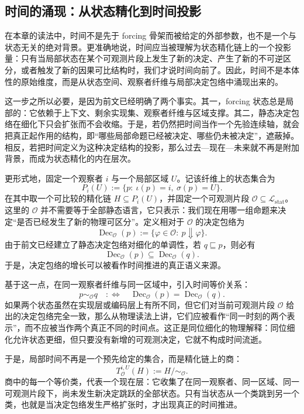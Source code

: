 \subsection{时间的涌现：从状态精化到时间投影}\label{subsec:physical-spacetime-skeleton-time-projection}

在本章的读法中，时间不是先于 forcing 骨架而被给定的外部参数，也不是一个与状态无关的绝对背景。更准确地说，时间应当被理解为状态精化链上的一个投影量：只有当局部状态在某个可观测片段上发生了新的决定、产生了新的不可逆区分，或者触发了新的因果可比结构时，我们才说时间向前了。因此，时间不是本体性的原始维度，而是从状态空间、观察者纤维与局部决定包络中涌现出来的。

这一步之所以必要，是因为前文已经明确了两个事实。其一，forcing 状态总是局部的：它依赖于上下文、剩余实现集、观察者纤维与区域支撑。其二，静态决定包络在细化下只会扩张而不会收缩。于是，若仍然把时间当作一个先验连续轴，就会把真正起作用的结构，即“哪些局部命题已经被决定、哪些仍未被决定”，遮蔽掉。相反，若把时间定义为这种决定结构的投影，那么过去—现在—未来就不再是附加背景，而成为状态精化的内在层次。

更形式地，固定一个观察者 \(i\) 与一个局部区域 \(U\)。记该纤维上的状态集合为
\[
P_i(U):=\{p:\ \iota(p)=i,\ \sigma(p)=U\}.
\]
在其中取一个可比较的精化链 \(H\subseteq P_i(U)\)，并固定一个可观测片段 \(\mathcal O\subseteq \mathcal L_{\mathrm{stat}}\)。这里的 \(\mathcal O\) 并不需要等于全部静态语言，它只表示：我们现在用哪一组命题来决定“是否已经发生了新的物理可区分”。定义相对于 \(\mathcal O\) 的决定包络为
\[
\operatorname{Dec}_{\mathcal O}(p)
:=
\{\varphi\in\mathcal O:\ p\Downarrow \varphi\}.
\]
由于前文已经建立了静态决定包络对细化的单调性，若 \(q\sqsubseteq p\)，则必有
\[
\operatorname{Dec}_{\mathcal O}(p)\subseteq \operatorname{Dec}_{\mathcal O}(q).
\]
于是，决定包络的增长可以被看作时间推进的真正语义来源。

基于这一点，在同一观察者纤维与同一区域中，引入时间等价关系：
\[
p\sim_{\mathcal O} q
\quad:\Longleftrightarrow\quad
\operatorname{Dec}_{\mathcal O}(p)=\operatorname{Dec}_{\mathcal O}(q).
\]
如果两个状态虽然在实现层或编码层上有所不同，但它们对当前可观测片段 \(\mathcal O\) 给出的决定包络完全一致，那么从物理读法上讲，它们应被看作“同一时刻的两个表示”，而不应被当作两个真正不同的时间点。这正是同位细化的物理解释：同位细化允许状态更细，但只要没有新增的可观测决定，它就不构成时间流逝。

于是，局部时间不再是一个预先给定的集合，而是精化链上的商：
\[
T^{i,U}_{\mathcal O}(H):=H/{\sim_{\mathcal O}}.
\]
商中的每一个等价类，代表一个现在层：它收集了在同一观察者、同一区域、同一可观测片段下，尚未发生新决定跳跃的全部状态。只有当状态从一个类跳到另一个类，也就是当决定包络发生严格扩张时，才出现真正的时间推进。

